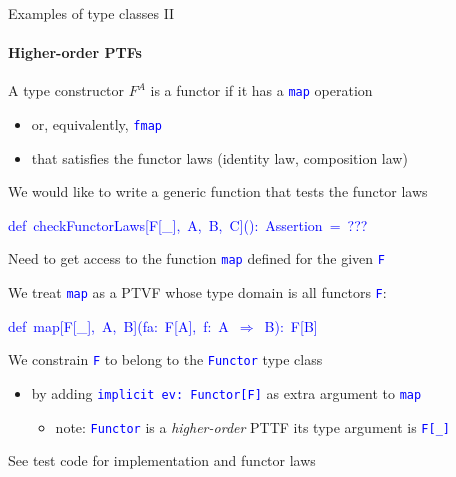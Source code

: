 \documentclass[english]{beamer}
\newenvironment{lyxcode}
   {\par\begin{list}{}{
     \setlength{\rightmargin}{\leftmargin}
     \setlength{\listparindent}{0pt}%
     \raggedright
     \setlength{\itemsep}{0pt}
     \setlength{\parsep}{0pt}
     \normalfont\ttfamily}%
    \def\{{\char`\{}
    \def\}{\char`\}}
    \def\textasciitilde{\char`\~}
    \item[]}
   {\end{list}}
\begin{document}
\begin{frame}{Examples of type classes II}


\framesubtitle{Higher-order PTFs}
\begin{itemize}
\item A type constructor $F^{A}$ is a functor if it has a \texttt{\textcolor{blue}{\footnotesize{}map}}
operation
\begin{itemize}
\item or, equivalently, \texttt{\textcolor{blue}{\footnotesize{}fmap}} 
\item that satisfies the functor laws (identity law, composition law)
\end{itemize}
\item We would like to write a generic function that tests the functor laws
\begin{lyxcode}
\textcolor{blue}{\footnotesize{}def~checkFunctorLaws{[}F{[}\_{]},~A,~B,~C{]}():~Assertion~=~???}{\footnotesize \par}
\end{lyxcode}
\item Need to get access to the function \texttt{\textcolor{blue}{\footnotesize{}map}}
defined for the given \texttt{\textcolor{blue}{\footnotesize{}F}}{\footnotesize \par}
\item We treat \texttt{\textcolor{blue}{\footnotesize{}map}} as a PTVF whose
type domain is all functors \texttt{\textcolor{blue}{\footnotesize{}F}}:
\begin{lyxcode}
\textcolor{blue}{\footnotesize{}def~map{[}F{[}\_{]},~A,~B{]}(fa:~F{[}A{]},~f:~A~$\Rightarrow$~B):~F{[}B{]}}{\footnotesize \par}
\end{lyxcode}
\item We constrain \texttt{\textcolor{blue}{\footnotesize{}F}} to belong
to the \texttt{\textcolor{blue}{\footnotesize{}Functor}} type class
\begin{itemize}
\item by adding \texttt{\textcolor{blue}{\footnotesize{}implicit ev:\ Functor{[}F{]}}}
as extra argument to \texttt{\textcolor{blue}{\footnotesize{}map}}{\footnotesize \par}
\begin{itemize}
\item note: \texttt{\textcolor{blue}{\footnotesize{}Functor}} is a \emph{higher-order}
PTTF \textendash{} its type argument is \texttt{\textcolor{blue}{\footnotesize{}F{[}\_{]}}}{\footnotesize \par}
\end{itemize}
\end{itemize}
\end{itemize}
See test code for implementation and functor laws
\end{frame}
\end{document}
